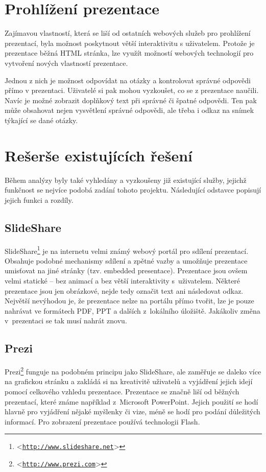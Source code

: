 \documentclass[11pt,twoside,a4paper]{book}
\let\oldUrl\url									%
\renewcommand\url[1]{<\texttt{\oldUrl{#1}}>}
\begin{document}
\section{Prohlížení prezentace}
Zajímavou vlastností, která se liší od ostatních webových služeb pro prohlížení prezentací, byla možnost poskytnout větší interaktivitu s uživatelem. Protože je prezentace běžná HTML stránka, lze využít možností webových technologií pro vytvoření nových vlastností prezentace.

Jednou z nich je možnost odpovídat na otázky a kontrolovat správné odpovědi přímo v prezentaci. Uživatelé si pak mohou vyzkoušet, co se z prezentace naučili. Navíc je možné zobrazit doplňkový text při správné či špatné odpovědi. Ten pak může obsahovat nejen vysvětlení správné odpovědi, ale třeba i odkaz na snímek týkající se dané otázky.

\section{Rešerše existujících řešení}
Během analýzy byly také vyhledány a vyzkoušeny již existující služby, jejichž funkčnost se nejvíce podobá zadání tohoto projektu. Následující odstavce popisují jejich funkci a rozdíly.

\subsection{SlideShare}
SlideShare\footnote{\url{http://www.slideshare.net}} je na internetu velmi známý webový portál pro sdílení prezentací. Obsahuje podobné mechanismy sdílení a zpětné vazby a umožňuje prezentace umisťovat na jiné stránky (tzv. embedded presentace). Prezentace jsou ovšem velmi statické – bez animací a bez větší interaktivity s~uživatelem. Některé prezentace jsou jen obrázkové, nejde tedy označit text ani následovat odkaz. Největší nevýhodou je, že prezentace nelze na portálu přímo tvořit, lze je pouze nahrávat ve formátech PDF, PPT a dalších z~lokálního úložiště. Jakákoliv změna v~prezentaci se tak musí nahrát znovu.

\subsection{Prezi}
Prezi\footnote{\url{http://www.prezi.com}} funguje na podobném principu jako SlideShare, ale zaměřuje se daleko více na grafickou stránku a zakládá si na kreativitě uživatelů a vyjádření jejich idejí pomocí celkového vzhledu prezentace. Prezentace se značně liší od běžných prezentací, které známe například z~Microsoft PowerPoint. Jejich použití se hodí hlavně pro vyjádření nějaké myšlenky či vize, méně se hodí pro podání důležitých informací. Pro zobrazení prezentace používá technologii Flash.
\end{document}
